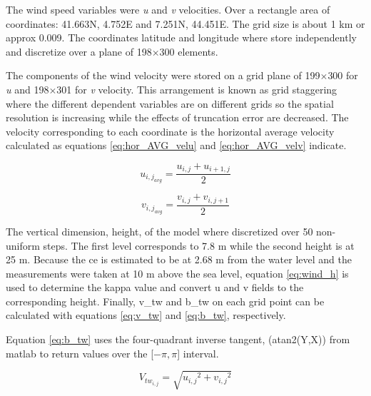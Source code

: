 The wind speed variables were \textit{u} and \textit{v} velocities. Over a rectangle area of coordinates: 41.663\degree N, 4.752\degree E and 7.251\degree N, 44.451\degree E. The grid size is about 1 km or approx 0.009\degree. The coordinates latitude and longitude where store independently and discretize over a plane of 198$\times$300 elements. \par

The components of the wind velocity were stored on a grid plane of 199$\times$300 for \textit{u} and 198$\times$301 for \textit{v} velocity. This arrangement is known as grid staggering where the different dependent variables are on different grids so the spatial resolution is increasing while the effects of truncation error are decreased. The velocity corresponding to each coordinate is the horizontal average velocity calculated as equations \ref{eq:hor_AVG_velu} and \ref{eq:hor_AVG_velv} indicate.  \par  

\begin{equation} \label{eq:hor_AVG_velu}
    u_{{i,j}_{avg}}=\frac{ u_{i,j} + u_{{i+1},j} } {2}
\end{equation}

\begin{equation} \label{eq:hor_AVG_velv}
    v_{{i,j}_{avg}}=\frac{ v_{i,j} + v_{i,{j+1}} } {2}
\end{equation}

The vertical dimension, height, of the model where discretized over 50 non-uniform steps. The first level corresponds to 7.8 m while the second height is at 25 m. Because the \acrshort{ce} is estimated to be at 2.68 m from the water level \cite{pennanen2015optimal} and the measurements were taken at 10 m above the sea level, equation \ref{eq:wind_h} is used to determine the \acrshort{kappa} value and convert \acrshort{u} and \acrshort{v} fields to the corresponding height. Finally, \acrshort{v_tw} and \acrshort{b_tw} on each grid point can be calculated with equations \ref{eq:v_tw} and \ref{eq:b_tw}, respectively. \par \noindent Equation \ref{eq:b_tw} uses the four-quadrant inverse tangent, (atan2(Y,X)) from \acrshort{matlab} to return values over the [$- \pi, \pi  $] interval.\par 

\begin{equation}\label{eq:v_tw}
    V_{tw_{i,j}}=\sqrt{{u_{i,j}}^2+{v_{i,j}}^2}
\end{equation}

